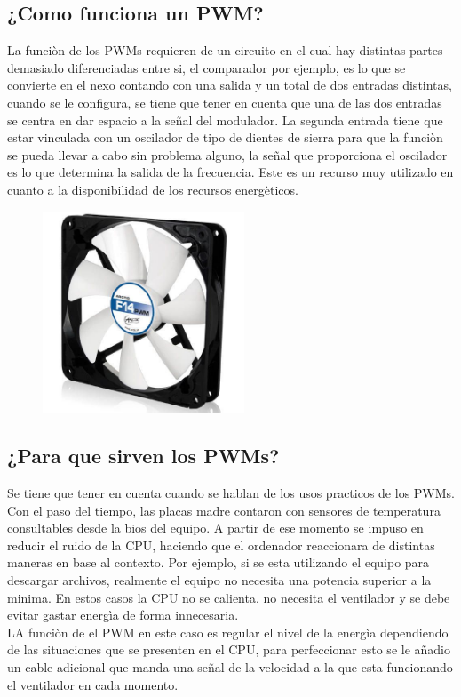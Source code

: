 \documentclass[12pt,a4paper]{article}
\begin{document}
\subsection{¿Como funciona un PWM?}
La funciòn de los PWMs requieren de un circuito en el cual hay distintas partes demasiado diferenciadas entre si, el comparador por ejemplo, es lo que se convierte en el nexo contando con una salida y un total de dos entradas distintas, cuando se le configura, se tiene que tener en cuenta que una de las dos entradas se centra en dar espacio a la señal del modulador. La segunda entrada tiene que estar vinculada con un oscilador de tipo de dientes de sierra para que la funciòn se pueda llevar a cabo sin problema alguno, la señal que proporciona el oscilador es lo que determina la salida de la frecuencia. Este es un recurso muy utilizado en cuanto a la disponibilidad de los recursos energèticos.

\begin{figure}[h!]
\centering
\includegraphics[width=6cm]{Arctic-F14-PWM.jpg} 
\end{figure}
\newpage


\subsection{¿Para que sirven los PWMs?}
Se tiene que tener en cuenta cuando se hablan de los usos practicos de los PWMs. Con el paso del tiempo, las placas madre contaron con sensores de temperatura consultables desde la bios del equipo. A partir de ese momento se impuso en reducir el ruido de la CPU, haciendo que el ordenador reaccionara de distintas maneras en base al contexto. Por ejemplo, si se esta utilizando el equipo para descargar archivos, realmente el equipo no necesita una potencia superior a la minima. En estos casos la CPU no se calienta, no necesita el ventilador y se debe evitar gastar energìa de forma innecesaria.\\
LA funciòn de el PWM en este caso es regular el nivel de la energìa dependiendo de las situaciones que se presenten en el CPU, para perfeccionar esto se le añadio un cable adicional que manda una señal de la velocidad a la que esta funcionando el ventilador en cada momento.
\end{document}
